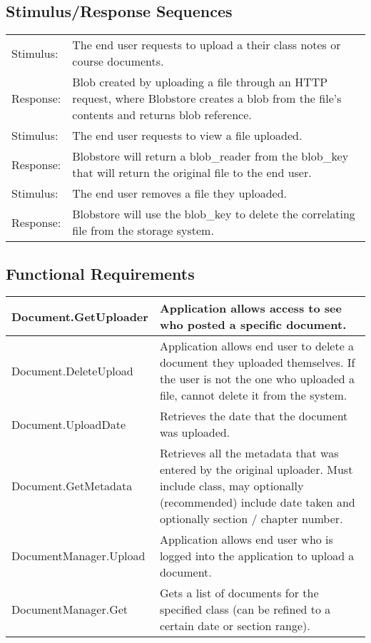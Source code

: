 \documentclass{scrreprt}
\begin{document}
\subsection{Stimulus/Response Sequences}
\begin{tabular}{| p{2cm} | p{12cm} | }
	\hline
	Stimulus: & The end user requests to upload a their class notes or course documents. \\
	Response: & Blob created by uploading a file through an HTTP request, where Blobstore creates a blob from the file’s contents and returns blob reference. \\ \hline
	Stimulus: & The end user requests to view a file uploaded. \\
	Response: & Blobstore will return a blob_reader from the blob_key that will return the original file to the end user. \\ \hline
	Stimulus: & The end user removes a file they uploaded.\\
	Response: & Blobstore will use the blob_key to delete the correlating file from the storage system.\\
	\hline

\end{tabular}

\subsection{Functional Requirements}

\begin{tabular}{| p{4.5cm} | p{9.5cm} |}
\hline
Document.GetUploader & Application allows access to see who posted a specific document. \\ \hline
Document.DeleteUpload & Application allows end user to delete a document they uploaded themselves. If the user is not the one who uploaded a file, cannot delete it from the system. \\ \hline
Document.UploadDate & Retrieves the date that the document was uploaded. \\ \hline
Document.GetMetadata & Retrieves all the metadata that was entered by the original uploader. Must include class, may optionally (recommended) include date taken and optionally section / chapter number. \\ \hline
DocumentManager.Upload & Application allows end user who is logged into the application to upload a document. \\ \hline
DocumentManager.Get & Gets a list of documents for the specified class (can be refined to a certain date or section range). \\

\hline
\end{tabular}
\end{document}

